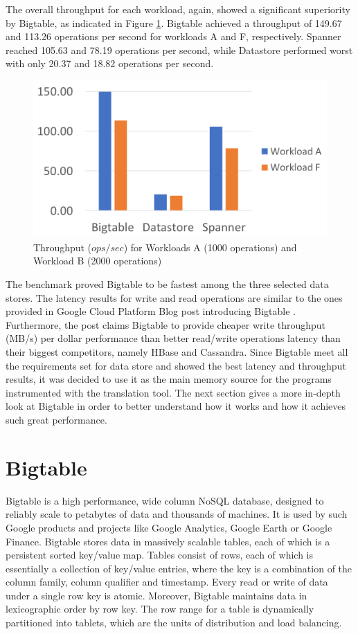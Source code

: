 \documentclass[bsc,frontabs,twoside,singlespacing,parskip,deptreport]{infthesis}     %
\begin{document}
The overall throughput for each workload, again, showed a significant superiority by Bigtable, as indicated in Figure \ref{throughput}. Bigtable achieved a throughput of 149.67 and 113.26 operations per second for workloads A and F, respectively. Spanner reached 105.63 and 78.19 operations per second, while Datastore performed worst with only 20.37 and 18.82 operations per second.

\begin{figure}[H]
	\centering
	\includegraphics[width=12cm]{throughput}
	\caption{Throughput (\(ops/sec\)) for Workloads A (1000 operations) and Workload B (2000 operations)}
	\label{throughput}
\end{figure}

The benchmark proved Bigtable to be fastest among the three selected data stores. The latency results for write and read operations are similar to the ones provided in Google Cloud Platform Blog post introducing Bigtable \citep{bigtable-introduction}. Furthermore, the post claims Bigtable to provide cheaper write throughput (MB/s) per dollar performance than better read/write operations latency than their biggest competitors, namely HBase and Cassandra. Since Bigtable meet all the requirements set for data store and showed the best latency and throughput results, it was decided to use it as the main memory source for the programs instrumented with the translation tool. The next section gives a more in-depth look at Bigtable in order to better understand how it works and how it achieves such great performance.

\section{Bigtable}

Bigtable \citep{google-bigtable} is a high performance, wide column NoSQL database, designed to reliably scale to petabytes of data and thousands of machines. It is used by such Google products and projects like Google Analytics, Google Earth or Google Finance. Bigtable stores data in massively scalable tables, each of which is a persistent sorted key/value map. Tables consist of rows, each of which is essentially a collection of key/value entries, where the key is a combination of the column family, column qualifier and timestamp. Every read or write of data under a single row key is atomic. Moreover, Bigtable maintains data in lexicographic order by row key. The row range for a table is dynamically partitioned into tablets, which are the units of distribution and load balancing.
\end{document}
